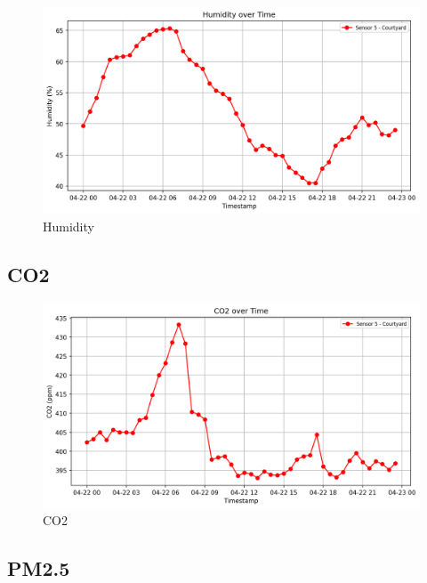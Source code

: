 \documentclass[
  12pt,
  letterpaper,
]{article}
\begin{document}
\begin{figure}[H]

{\centering \includegraphics[width=0.85\linewidth,height=\textheight,keepaspectratio]{./charts/humidity_chart.png}

}

\caption{Humidity}

\end{figure}%

\subsection{CO2}\label{co2}

\begin{figure}[H]

{\centering \includegraphics[width=0.85\linewidth,height=\textheight,keepaspectratio]{./charts/co2_chart.png}

}

\caption{CO2}

\end{figure}%

\subsection{PM2.5}\label{pm2.5}
\end{document}
